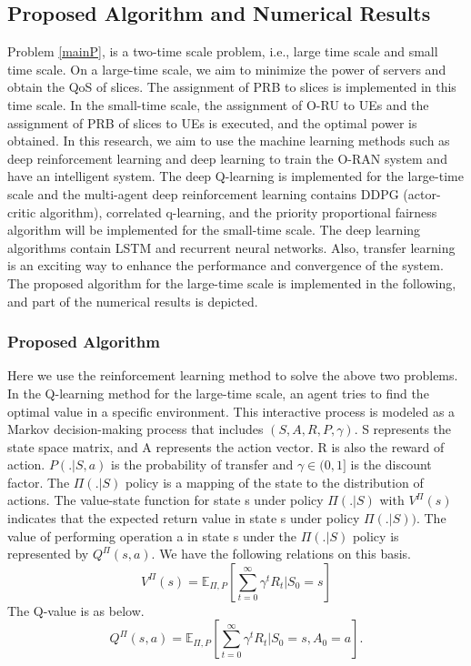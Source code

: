 \documentclass{article}
\begin{document}
\subsection{Proposed Algorithm and Numerical Results}
Problem \eqref{mainP}, is a two-time scale problem, i.e., large time scale and small time scale. On a large-time scale, we aim to minimize the power of servers and obtain the QoS of slices. The assignment of PRB to slices is implemented in this time scale. In the small-time scale, the assignment of O-RU to UEs and the assignment of PRB of slices to UEs is executed, and the optimal power is obtained.
In this research, we aim to use the machine learning methods such as deep reinforcement learning and deep learning to train the O-RAN system and have an intelligent system.
The deep Q-learning is implemented for the large-time scale and 
 the multi-agent deep reinforcement learning contains DDPG (actor-critic algorithm), correlated q-learning, and the priority proportional fairness algorithm will be implemented for the small-time scale. 
The deep learning algorithms contain LSTM and recurrent neural networks. Also, transfer learning is an exciting way to enhance the performance and convergence of the system.
The proposed algorithm for the large-time scale is implemented in the following, and part of the numerical results is depicted.
\subsubsection{Proposed Algorithm}
Here we use the reinforcement learning method to solve the above two problems.
In the Q-learning method for the large-time scale, an agent tries to find the optimal value in a specific environment. This interactive process is modeled as a Markov decision-making process that includes $ (S, A, R, P, \gamma) $.
S represents the state space matrix, and A represents the action vector. R is also the reward of action. $ P (. | S, a) $ is the probability of transfer and $ \gamma \in (0,1] $ is the discount factor.  The $ \Pi (. | S) $ policy is a mapping of the state to the distribution of actions. The value-state function for state s under policy $ \Pi (. | S) $ with $ V^{\Pi} (s) $ indicates that the expected return value in state s under policy $ \Pi (. | S) ) $. The value of performing operation a in state s under the $ \Pi (. | S) $ policy is represented by $ Q ^ {\Pi} (s, a) $. We have the following relations on this basis.
\begin{equation}
	V^{\Pi}(s) = \mathbb{E}_{\Pi,P}[\sum_{t=0}^{\infty}\gamma^tR_t|S_0=s]
 \end{equation}
 The Q-value is as below.
 \begin{equation}
	Q^{\Pi}(s,a) = \mathbb{E}_{\Pi,P}[\sum_{t=0}^{\infty}\gamma^tR_t|S_0=s,A_0=a].
\end{equation}
 
\end{document}
